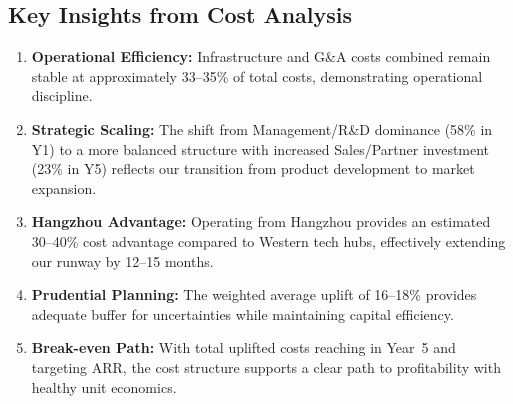 \documentclass[11pt, a4paper, oneside]{article}
\begin{document}
\begin{table}[H]
\centering
\caption{Infrastructure \& Platform Investment ROI}
\label{tab:infrastructure_roi}
\end{table}

\subsection{Key Insights from Cost Analysis}

\begin{enumerate}
    \item \textbf{Operational Efficiency:} Infrastructure and G\&A costs combined remain stable at approximately 33--35\% of total costs, demonstrating operational discipline.
    
    \item \textbf{Strategic Scaling:} The shift from Management/R\&D dominance (58\% in Y1) to a more balanced structure with increased Sales/Partner investment (23\% in Y5) reflects our transition from product development to market expansion.
    
    \item \textbf{Hangzhou Advantage:} Operating from Hangzhou provides an estimated 30--40\% cost advantage compared to Western tech hubs, effectively extending our runway by 12--15 months.
    
    \item \textbf{Prudential Planning:} The weighted average uplift of 16--18\% provides adequate buffer for uncertainties while maintaining capital efficiency.
    
    \item \textbf{Break-even Path:} With total uplifted costs reaching  in Year~5 and targeting  ARR, the cost structure supports a clear path to profitability with healthy unit economics.
\end{enumerate}
\end{document}
